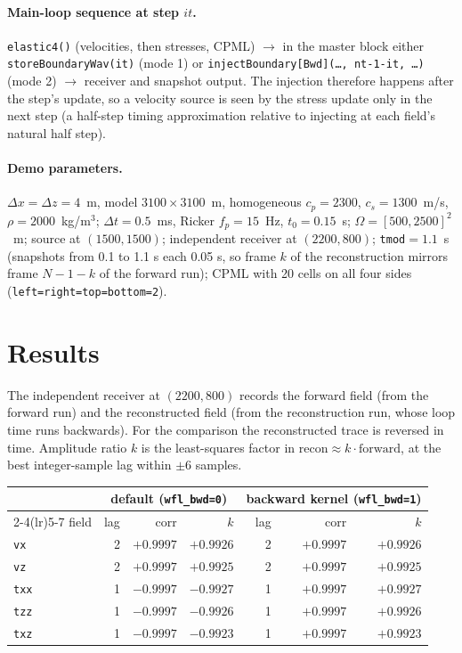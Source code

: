 \documentclass[11pt,a4paper]{article}
\begin{document}
\paragraph{Main-loop sequence at step $it$.}
\texttt{elastic4()} (velocities, then stresses, CPML) $\rightarrow$ in the master
block either \texttt{storeBoundaryWav(it)} (mode 1) or
\texttt{injectBoundary[Bwd](\dots, nt-1-it, \dots)} (mode 2) $\rightarrow$ receiver
and snapshot output. The injection therefore happens after the step's update, so
a velocity source is seen by the stress update only in the next step (a
half-step timing approximation relative to injecting at each field's natural
half step).

\paragraph{Demo parameters.}
$\Delta x=\Delta z=4$~m, model $3100\times3100$~m, homogeneous
$c_p=2300$, $c_s=1300$~m/s, $\rho=2000$~kg/m$^3$; $\Delta t=0.5$~ms,
Ricker $f_p=15$~Hz, $t_0=0.15$~s; $\Omega=[500,2500]^2$~m; source at
$(1500,1500)$; independent receiver at $(2200,800)$; \texttt{tmod}$=1.1$~s
(snapshots from 0.1 to 1.1 s each 0.05 s, so frame $k$ of the reconstruction mirrors frame
$N{-}1{-}k$ of the forward run); CPML with 20 cells on all four sides
(\texttt{left=right=top=bottom=2}).

\section{Results}\label{sec:results}
The independent receiver at $(2200,800)$ records the forward field (from the forward
run) and the reconstructed field (from the reconstruction run, whose loop time
runs backwards). For the comparison the reconstructed trace is reversed in
time. Amplitude ratio $k$ is the least-squares factor in
$\text{recon}\approx k\cdot\text{forward}$, at the best integer-sample lag within $\pm6$ samples.

\begin{center}
\begin{tabular}{lrrrrrr}\toprule
 & \multicolumn{3}{c}{default (\texttt{wfl\_bwd=0})} & \multicolumn{3}{c}{backward kernel (\texttt{wfl\_bwd=1})}\\
 \cmidrule(lr){2-4}\cmidrule(lr){5-7}
field & lag & corr & $k$ & lag & corr & $k$\\\midrule
\texttt{vx}  & 2 & $+0.9997$ & $+0.9926$ & 2 & $+0.9997$ & $+0.9926$\\
\texttt{vz}  & 2 & $+0.9997$ & $+0.9925$ & 2 & $+0.9997$ & $+0.9925$\\
\texttt{txx} & 1 & $-0.9997$ & $-0.9927$ & 1 & $+0.9997$ & $+0.9927$\\
\texttt{tzz} & 1 & $-0.9997$ & $-0.9926$ & 1 & $+0.9997$ & $+0.9926$\\
\texttt{txz} & 1 & $-0.9997$ & $-0.9923$ & 1 & $+0.9997$ & $+0.9923$\\\bottomrule
\end{tabular}
\end{center}
\end{document}
